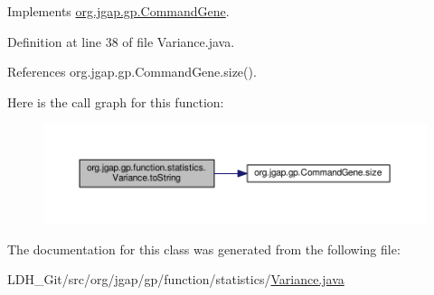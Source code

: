 Implements \hyperlink{classorg_1_1jgap_1_1gp_1_1_command_gene_a236141d99059da808afe7a9217e411c7}{org.\-jgap.\-gp.\-Command\-Gene}.



Definition at line 38 of file Variance.\-java.



References org.\-jgap.\-gp.\-Command\-Gene.\-size().



Here is the call graph for this function\-:
\nopagebreak
\begin{figure}[H]
\begin{center}
\leavevmode
\includegraphics[width=350pt]{classorg_1_1jgap_1_1gp_1_1function_1_1statistics_1_1_variance_a16d9a59025cb874c9fefd34c907919e4_cgraph}
\end{center}
\end{figure}




The documentation for this class was generated from the following file\-:\begin{DoxyCompactItemize}
\item 
L\-D\-H\-\_\-\-Git/src/org/jgap/gp/function/statistics/\hyperlink{_variance_8java}{Variance.\-java}\end{DoxyCompactItemize}
